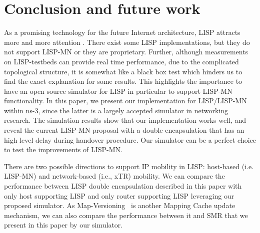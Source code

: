 \section{Conclusion and future work}\label{sec:conclusion}
As a promising technology for the future Internet architecture, LISP attracts
more and more attention . There exist some LISP implementations,
but they do not support LISP-MN or they are proprietary. Further, although measurements on
LISP-testbeds can provide real time performance, due to the complicated
topological structure, it is somewhat like a black box test which hinders us to
find the exact explanation for some results. This highlights the importance to
have an open source simulator for LISP in particular to support LISP-MN
functionality. In this paper, we present our implementation for LISP/LISP-MN
within ns-3, since the latter is a largely accepted simulator in networking
research. The simulation results show that our implementation works well, and
reveal the current LISP-MN proposal with a double encapsulation that has an high
level delay during handover procedure. Our simulator can be a perfect choice to
test the improvements of LISP-MN. 

There are two possible directions to support IP mobility in LISP: host-based
(i.e. LISP-MN) and network-based (i.e., xTR) mobility. We can compare the
performance between LISP double encapsulation described in this paper with only
host supporting LISP and only router supporting LISP leveraging our proposed
simulator. As Map-Versioning~\cite{rfc6834} is another Mapping Cache update
mechanism, we can also compare the performance between it and SMR that we
present in this paper by our simulator.


